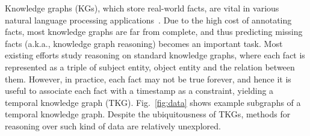 


Knowledge graphs (KGs), which store real-world facts, are vital in various natural language processing applications~\cite{Bordes2013TranslatingEF,Schlichtkrull2018ModelingRD,kazemi2019relational}. Due to the high cost of annotating facts, most knowledge graphs are far from complete, and thus predicting missing facts (a.k.a., knowledge graph reasoning) becomes an important task. Most existing efforts study reasoning on standard knowledge graphs, where each fact is represented as a triple of subject entity, object entity and the relation between them. However, in practice, each fact may not be true forever, and hence it is useful to associate each fact with a timestamp as a constraint, yielding a temporal knowledge graph (TKG). Fig.~\ref{fig:data} shows example subgraphs of a temporal knowledge graph. Despite the ubiquitousness of TKGs, methods for reasoning over such kind of data are relatively unexplored.




